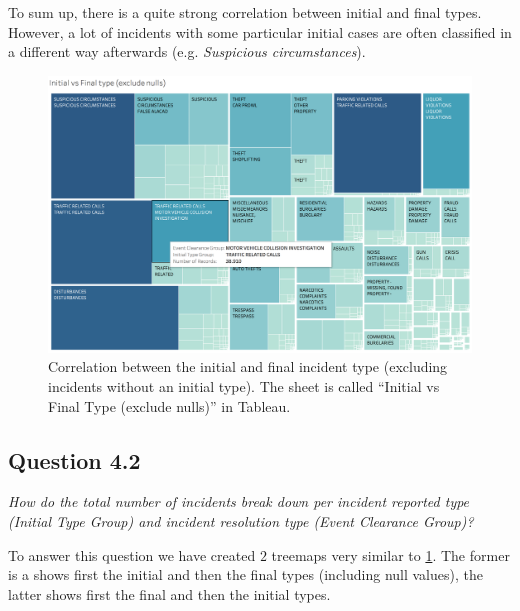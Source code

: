 To sum up, there is a quite strong correlation between initial and final types.
However, a lot of incidents with some particular initial cases are often classified in a different way afterwards (e.g. \textit{Suspicious circumstances}).

\begin{figure}[h]
	\centering
	\includegraphics[width=\columnwidth]{figures/4_1_initial_vs_final_group_treemap}
	\caption{Correlation between the initial and final incident type (excluding incidents without an initial type). The sheet is called ``Initial vs Final Type (exclude nulls)'' in Tableau.}
	\label{fig:4_1_initial_vs_final_group_treemap}
\end{figure}


\subsection*{Question 4.2}
\textit{How do the total number of incidents break down per incident reported type (Initial Type Group) and incident resolution type (Event Clearance Group)?}

To answer this question we have created $2$ treemaps very similar to \cref{fig:4_1_initial_vs_final_group_treemap}.
The former is a shows first the initial and then the final types (including null values), the latter shows first the final and then the initial types.



